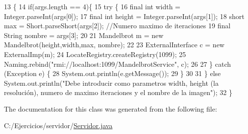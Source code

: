 \begin{DoxyCode}
13                                            \{
14         \textcolor{keywordflow}{if}(args.length == 4)\{
15             \textcolor{keywordflow}{try} \{
16                 \textcolor{keyword}{final} \textcolor{keywordtype}{int} width = Integer.parseInt(args[0]);
17                 \textcolor{keyword}{final} \textcolor{keywordtype}{int} height = Integer.parseInt(args[1]);
18                 \textcolor{keywordtype}{short} max = Short.parseShort(args[2]); \textcolor{comment}{//Numero maximo de iteraciones}
19                 \textcolor{keyword}{final} String nombre = args[3];
20                 
21                 Mandelbrot m = \textcolor{keyword}{new} Mandelbrot(height,width,max, nombre);
22 
23                 ExternalInterface c = \textcolor{keyword}{new} ExternalImp(m);
24                 LocateRegistry.createRegistry(1099);
25                 Naming.rebind(\textcolor{stringliteral}{"rmi://localhost:1099/MandelbrotService"}, c);
26                 
27             \} \textcolor{keywordflow}{catch} (Exception e) \{
28                 System.out.println(e.getMessage());
29             \}
30             
31         \} \textcolor{keywordflow}{else} System.out.println(\textcolor{stringliteral}{"Debe introducir como parametros width, height (la resolución), numero de
       maximo iteraciones y el nombre de la imagen"});
32     \}
\end{DoxyCode}


The documentation for this class was generated from the following file\+:\begin{DoxyCompactItemize}
\item 
C\+:/\+Ejercicios/servidor/\hyperlink{Servidor_8java}{Servidor.\+java}\end{DoxyCompactItemize}
